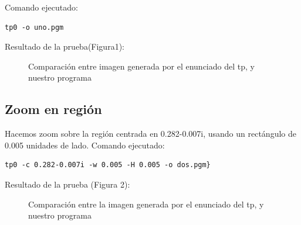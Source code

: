 \documentclass [12pt, a4paper]{article}
\begin{document}
Comando ejecutado:
	\begin{lstlisting}[frame=simple,stepnumber=0]
tp0 -o uno.pgm
	\end{lstlisting} \vspace{5mm}
	
	Resultado de la prueba(Figura1):
	\begin{figure}[h]
		\centering
		\caption{Comparación entre imagen generada por el enunciado del tp, y nuestro programa}
		\label{f:comparacion1}
	\end{figure}
	\subsection{Zoom en región}
	Hacemos zoom sobre la región centrada en 0.282-0.007i, usando un
	rectángulo de 0.005 unidades de lado.
Comando ejecutado:	
	\begin{lstlisting}[stepnumber=0,frame=simple]
tp0 -c 0.282-0.007i -w 0.005 -H 0.005 -o dos.pgm} 
	\end{lstlisting} \vspace{5mm}
	Resultado de la prueba (Figura 2):
	\begin{figure}[h]
		\centering
		\caption{Comparación entre la imagen generada por el enunciado del tp, y nuestro programa}
		\label{f:comparacion2}
	\end{figure}
\end{document}
